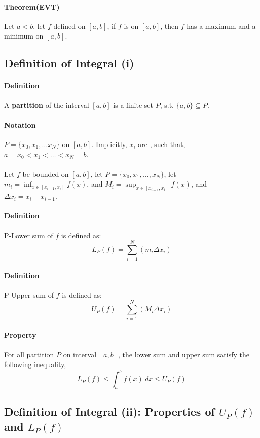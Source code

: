 \documentclass{article}
\begin{document}
	\paragraph{Theorem(EVT)} Let $a < b$, let $f$ defined on $[a,b]$, if $f$ is  on $[a,b]$, then $f$ has a maximum and a minimum on $[a,b]$.
	\subsection{Definition of Integral (i)}
	\paragraph{Definition} A \textbf{partition} of the interval $[a,b]$ is a finite set $P$, s.t. $\{a,b\} \subseteq P$.
	\paragraph{Notation} $P = \{x_0, x_1, \dots x_N\}$ on $[a,b]$. Implicitly, $x_i$ are , such that, $a = x_0 < x_1 < \dots < x_N = b$.
	\paragraph{} Let $f$ be bounded on $[a,b]$, let $P = \{x_0, x_1, \dots , x_N\}$, let $m_i = \inf_{x \in [x_{i-1}, x_i]} f(x)$, and $M_i = \sup_{x \in [x_{i-1}, x_i]} f(x)$, and $\Delta x_i = x_i - x_{i-1}$.
	\paragraph{Definition} P-Lower sum of $f$ is defined as:
	\[
	L_P (f) = \sum_{i=1}^N (m_i \Delta x_i)
	\]
	\paragraph{Definition} P-Upper sum of $f$ is defined as:
	\[
	U_P (f) = \sum_{i=1}^N (M_i \Delta x_i)
	\]
	\paragraph{Property} For all partition $P$ on interval $[a,b]$, the lower sum and upper sum satisfy the following inequality,
	\[
	L_P (f) \leq \int_a^bf(x)\ dx \leq U_P (f)
	\]
	\subsection{Definition of Integral (ii): Properties of $U_P (f)$ and $L_P (f)$}
\end{document}
